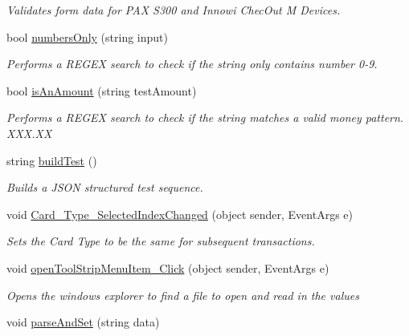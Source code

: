 \begin{DoxyCompactItemize}
\begin{DoxyCompactList}\small\item\em Validates form data for P\+AX S300 and Innowi Chec\+Out M Devices. \end{DoxyCompactList}\item 
bool \mbox{\hyperlink{class_cert_complete_1_1_test___creation___form_a821663f4d5be3f2940132b2fc68eb681}{numbers\+Only}} (string input)
\begin{DoxyCompactList}\small\item\em Performs a R\+E\+G\+EX search to check if the string only contains number 0-\/9. \end{DoxyCompactList}\item 
bool \mbox{\hyperlink{class_cert_complete_1_1_test___creation___form_a649494ce93fde6175d11beca3d442156}{is\+An\+Amount}} (string test\+Amount)
\begin{DoxyCompactList}\small\item\em Performs a R\+E\+G\+EX search to check if the string matches a valid money pattern. X\+X\+X.\+XX \end{DoxyCompactList}\item 
string \mbox{\hyperlink{class_cert_complete_1_1_test___creation___form_a01735d4c5096ec31a9fd14ade3aaa574}{build\+Test}} ()
\begin{DoxyCompactList}\small\item\em Builds a J\+S\+ON structured test sequence. \end{DoxyCompactList}\item 
void \mbox{\hyperlink{class_cert_complete_1_1_test___creation___form_ae9c262fc2f8c4a816d16077a05e4419b}{Card\+\_\+\+Type\+\_\+\+Selected\+Index\+Changed}} (object sender, Event\+Args e)
\begin{DoxyCompactList}\small\item\em Sets the Card Type to be the same for subsequent transactions. \end{DoxyCompactList}\item 
void \mbox{\hyperlink{class_cert_complete_1_1_test___creation___form_aa428c9c9cabb16234bec464d34dc960c}{open\+Tool\+Strip\+Menu\+Item\+\_\+\+Click}} (object sender, Event\+Args e)
\begin{DoxyCompactList}\small\item\em Opens the windows explorer to find a file to open and read in the values \end{DoxyCompactList}\item 
void \mbox{\hyperlink{class_cert_complete_1_1_test___creation___form_a008b539cf7a0d4e45b5a65eff3be0006}{parse\+And\+Set}} (string data)

\end{DoxyCompactItemize}
